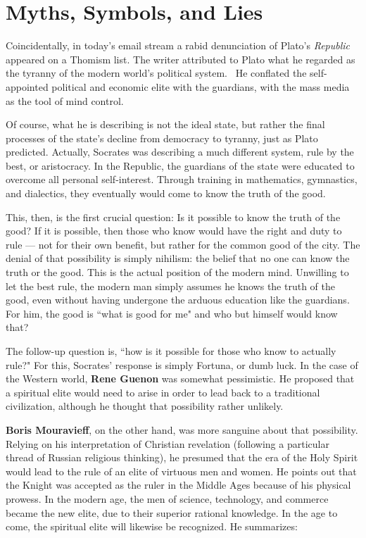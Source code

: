 \section{Myths, Symbols, and Lies}

Coincidentally, in today's email stream a rabid denunciation of Plato's \emph{Republic} appeared on a Thomism list. The writer attributed to Plato what he regarded as the tyranny of the modern world's political system.  He conflated the self-appointed political and economic elite with the guardians, with the mass media as the tool of mind control.

Of course, what he is describing is not the ideal state, but rather the final processes of the state's decline from democracy to tyranny, just as Plato predicted. Actually, Socrates was describing a much different system, rule by the best, or aristocracy. In the Republic, the guardians of the state were educated to overcome all personal self-interest. Through training in mathematics, gymnastics, and dialectics, they eventually would come to know the truth of the good.

This, then, is the first crucial question: Is it possible to know the truth of the good? If it is possible, then those who know would have the right and duty to rule — not for their own benefit, but rather for the common good of the city. The denial of that possibility is simply nihilism: the belief that no one can know the truth or the good. This is the actual position of the modern mind. Unwilling to let the best rule, the modern man simply assumes he knows the truth of the good, even without having undergone the arduous education like the guardians. For him, the good is ``what is good for me" and who but himself would know that?

The follow-up question is, ``how is it possible for those who know to actually rule?" For this, Socrates' response is simply Fortuna, or dumb luck. In the case of the Western world, \textbf{Rene Guenon} was somewhat pessimistic. He proposed that a spiritual elite would need to arise in order to lead back to a traditional civilization, although he thought that possibility rather unlikely.

\textbf{Boris Mouravieff}, on the other hand, was more sanguine about that possibility. Relying on his interpretation of Christian revelation (following a particular thread of Russian religious thinking), he presumed that the era of the Holy Spirit would lead to the rule of an elite of virtuous men and women. He points out that the Knight was accepted as the ruler in the Middle Ages because of his physical prowess. In the modern age, the men of science, technology, and commerce became the new elite, due to their superior rational knowledge. In the age to come, the spiritual elite will likewise be recognized. He summarizes:

